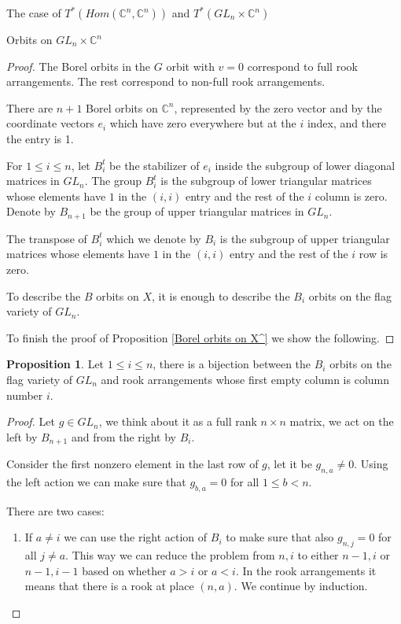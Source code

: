 \documentclass[12pt]{article}
\newcommand{\C}{\mathbb{C}}
\theoremstyle{plain}
\theoremstyle{definition}
\newtheorem{prop}[theorem]{Proposition}
\begin{document}
\begin{subsection}{The case of $T^*(Hom(\C^n,\C^n))$ and $T^*(GL_n\times \C^n)$}
\begin{subsubsection}{Orbits on $GL_n\times \C^n$}
    \begin{proof}
        
    The Borel orbits in the $G$ orbit with $v=0$ correspond to full rook arrangements. The rest correspond to non-full rook arrangements.

    There are $n+1$ Borel orbits on $\C^n$, represented by the zero vector and by the coordinate vectors $e_i$ which have zero everywhere but at the $i$ index, and there the entry is 1. 
    
    For $1\leq i\leq n$, let $B^t_i$ be the stabilizer of $e_i$ inside the subgroup of lower diagonal matrices in $GL_n$. The group $B^t_i$ is the subgroup of lower triangular matrices whose elements have $1$ in the $(i,i)$ entry and the rest of the $i$ column is zero. Denote by $B_{n+1}$ be the group of upper triangular matrices in $GL_n$.

    The transpose of $B_i^t$ which we denote by $B_i$ is the subgroup of upper triangular matrices whose elements have $1$ in the $(i,i)$ entry and the rest of the $i$ row is zero. 

    To describe the $B$ orbits on $X$, it is enough to describe the $B_i$ orbits on the flag variety of $GL_n$.

    To finish the proof of Proposition \ref{Borel orbits on X^} we show the following.

    \end{proof}

    
    \begin{prop}\label{B_i orbits}
        Let $1\leq i\leq n$, there is a bijection between the $B_i$ orbits on the flag variety of $GL_n$ and rook arrangements whose first empty column is column number $i$.
    \end{prop}

    \begin{proof}
        Let $g\in GL_n$, we think about it as a full rank $n\times n$ matrix, we act on the left by $B_{n+1}$ and from the right by $B_i$. 

        Consider the first nonzero element in the last row of $g$, let it be $g_{n,a}\neq 0$. Using the left action we can make sure that $g_{b,a}=0$ for all $1\leq b<n$. 

        There are two cases:

        \begin{enumerate}
            \item If $a\neq i$ we can use the right action of $B_i$ to make sure that also $g_{n,j}=0$ for all $j\neq a$. This way we can reduce the problem from $n,i$ to either $n-1,i$ or $n-1,i-1$ based on whether $a>i$ or $a<i$. In the rook arrangements it means that there is a rook at place $(n,a)$. We continue by induction.


\end{enumerate}
\end{proof}
\end{subsubsection}
\end{subsection}
\end{document}
